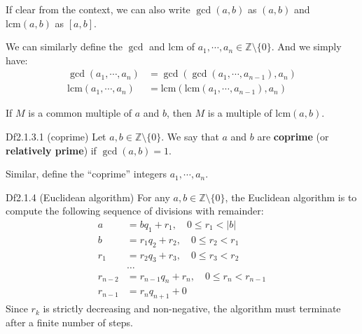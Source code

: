 \documentclass{article}
\newcommand{\lcm}{\text{lcm}}
\begin{document}
\begin{Rmk}{}
    \begin{compactenum}
        \item \textcolor{Df}{If clear from the context, we can also write $\gcd(a, b)$ as $(a, b)$ and $\lcm(a, b)$ as $[a, b]$.}
        \item \textcolor{Df}{We can similarly define the $\gcd$ and $\lcm$ of $a_1, \cdots, a_n\in\mathbb{Z}\setminus \{0\}$.} And we simply have: 
            \textcolor{Th}{$$ \begin{aligned}
                \gcd(a_1, \cdots, a_n) &= \gcd(\gcd(a_1, \cdots, a_{n-1}), a_n) \\
                \lcm(a_1, \cdots, a_n) &= \lcm(\lcm(a_1, \cdots, a_{n-1}), a_n)
            \end{aligned} $$}
        \item \textcolor{Th}{If $M$ is a common multiple of $a$ and $b$, then $M$ is a multiple of $\lcm(a, b)$.}
    \end{compactenum}
\end{Rmk}

\begin{Df}{Df2.1.3.1 (coprime)}
    Let $a, b\in\mathbb{Z}\setminus \{0\}$. We say that $a$ and $b$ are \textbf{coprime} (or \textbf{relatively prime}) if $\gcd(a, b) = 1$.
\end{Df}

\begin{Rmk}{}
    \textcolor{Df}{Similar, define the ``coprime'' integers $a_1, \cdots, a_n$.}
\end{Rmk}

\begin{Df}{Df2.1.4 (Euclidean algorithm)}
    For any $a, b\in\mathbb{Z}\setminus \{0\}$, the Euclidean algorithm is to compute the following sequence of divisions with remainder:
    $$ \begin{aligned}
        a &= bq_1 + r_1, \quad 0\leq r_1 < |b| \\
        b &= r_1q_2 + r_2, \quad 0\leq r_2 < r_1 \\
        r_1 &= r_2q_3 + r_3, \quad 0\leq r_3 < r_2 \\
        &\dots \\
        r_{n-2} &= r_{n-1}q_n + r_n, \quad 0\leq r_n < r_{n-1} \\
        r_{n-1} &= r_nq_{n+1} + 0
    \end{aligned} $$
    \textcolor{Th}{Since $r_k$ is strictly decreasing and non-negative, the algorithm must terminate after a finite number of steps.}
\end{Df}
\end{document}
